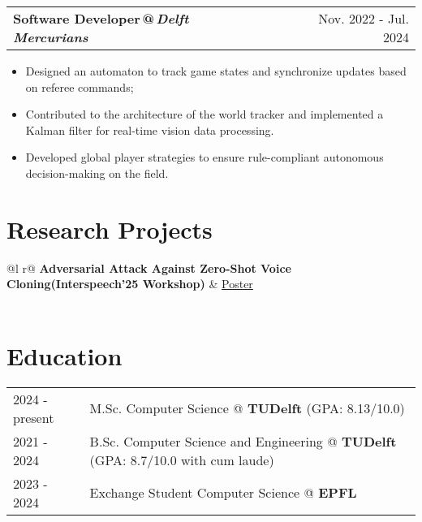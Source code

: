 \documentclass[a4paper,12pt]{article}
\makeatletter
\newenvironment{joblong}[2]{
  \begin{tabularx}{\linewidth}{@{}l X r@{}}
  \textbf{#1} & \hfill & #2 \\[1pt]    %
  \end{tabularx}
  \begin{minipage}[t]{\linewidth}
  \begin{itemize}[leftmargin=1em, topsep=0pt, itemsep=1pt, parsep=0pt, partopsep=0pt, label=--]
}{
  \end{itemize}
  \end{minipage}
}
\newcommand{\RoleAt}[2]{\textbf{#1}\,{\color{gray70}@}\,{\normalfont\itshape #2}}
\makeatother
\begin{document}
\begin{joblong}{\RoleAt{Software Developer}{Delft Mercurians}}{Nov. 2022 - Jul. 2024}
            \item Designed an automaton to track game states and synchronize updates based on referee commands;
            \item Contributed to the architecture of the world tracker and implemented a Kalman filter for real-time vision data processing.
            \item Developed global player strategies to ensure rule-compliant autonomous decision-making on the field.
\end{joblong}
  


\section{Research Projects}\vspace{-4pt}

\begin{tabularx}{\linewidth}{ @{}l r@{} }
\textbf{Adversarial Attack Against Zero-Shot Voice Cloning(Interspeech'25 Workshop)} & \hfill \href{https://advspeech.sosadlulu.com/}{Poster} \\[3.75pt]
  \\
\end{tabularx}

\section{Education}
\begin{tabularx}{\linewidth}{@{}l X@{}}	
2024 - present & M.Sc. Computer Science @ \textbf{TUDelft} \hfill \normalsize (GPA: 8.13/10.0) \\

2021 - 2024 & B.Sc. Computer Science and Engineering @ \textbf{TUDelft} \hfill (GPA: 8.7/10.0 with cum laude) \\ 

2023 - 2024 & Exchange Student Computer Science @ \textbf{EPFL} \hfill   \\

\end{tabularx}
\end{document}
